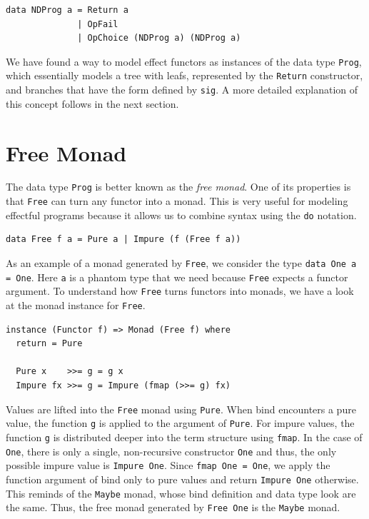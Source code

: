 \documentclass[a4paper, 11pt, fleqn, twoside]{scrreprt}
\newcommand{\todo}[1]{\marginpar{\textbf{TODO:} #1}}
\newcommand{\hinl}[1]{\texttt{#1}}
\newcommand{\cinl}[1]{\texttt{#1}}
\begin{document}
\begin{verbatim}
data NDProg a = Return a
              | OpFail
              | OpChoice (NDProg a) (NDProg a)
\end{verbatim}

We have found a way to model effect functors as instances of the data type \hinl{Prog}, which essentially models a tree with leafs, represented by the \hinl{Return} constructor, and branches that have the form defined by \hinl{sig}.
\todo{Tree structure visualization}
A more detailed explanation of this concept follows in the next section.

\section{Free Monad}

The data type \hinl{Prog} is better known as the \textit{free monad}.
One of its properties is that \hinl{Free} can turn any functor into a monad.
This is very useful for modeling effectful programs because it allows us to combine syntax using the \hinl{do} notation.

\begin{verbatim}
data Free f a = Pure a | Impure (f (Free f a))
\end{verbatim}

As an example of a monad generated by \cinl{Free}, we consider the type \hinl{data One a = One}.
Here \hinl{a} is a phantom type that we need because \hinl{Free} expects a functor argument.
To understand how \cinl{Free} turns functors into monads, we have a look at the monad instance for \hinl{Free}.

\begin{verbatim}
instance (Functor f) => Monad (Free f) where
  return = Pure

  Pure x    >>= g = g x
  Impure fx >>= g = Impure (fmap (>>= g) fx)
\end{verbatim}

Values are lifted into the \cinl{Free} monad using \cinl{Pure}.
When bind encounters a pure value, the function \hinl{g} is applied to the argument of \hinl{Pure}.
For impure values, the function \hinl{g} is distributed deeper into the term structure using \hinl{fmap}.
In the case of \hinl{One}, there is only a single, non-recursive constructor \hinl{One} and thus, the only possible impure value is \hinl{Impure One}.
Since \hinl{fmap One = One}, we apply the function argument of bind only to pure values and return \cinl{Impure One} otherwise.
This reminds of the \hinl{Maybe} monad, whose bind definition and data type look are the same.
Thus, the free monad generated by \hinl{Free One} is the \hinl{Maybe} monad.
\end{document}
